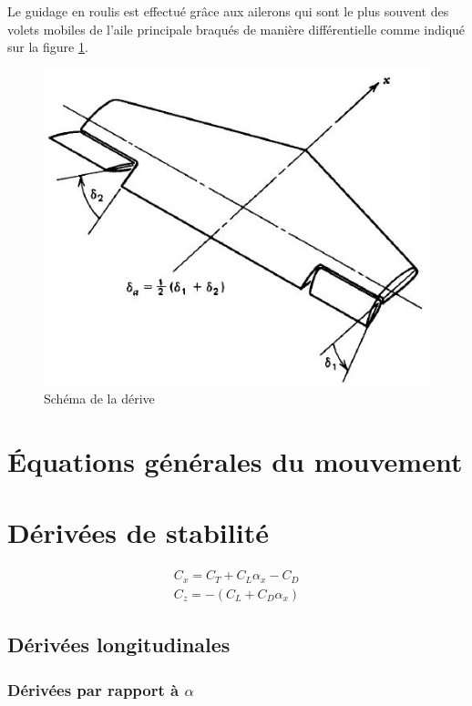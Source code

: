 \documentclass{report}
\begin{document}
Le guidage en roulis est effectué grâce aux ailerons qui sont le plus souvent des volets mobiles de l'aile principale braqués de manière différentielle comme indiqué sur la figure \ref{36}.

\begin{figure}[h!]
    \centering
    \includegraphics[scale=0.7]{36.JPG}
    \caption{Schéma de la dérive}
    \label{36}
\end{figure}


\chapter{Équations générales du mouvement}

\chapter{Dérivées de stabilité}

\begin{eqnarray}
C_x=C_T+C_L\alpha_x-C_D\\
C_z=-(C_L+C_D\alpha_x)
\end{eqnarray}

\section{Dérivées longitudinales}
\subsection{Dérivées par rapport à $\alpha$}
\end{document}
